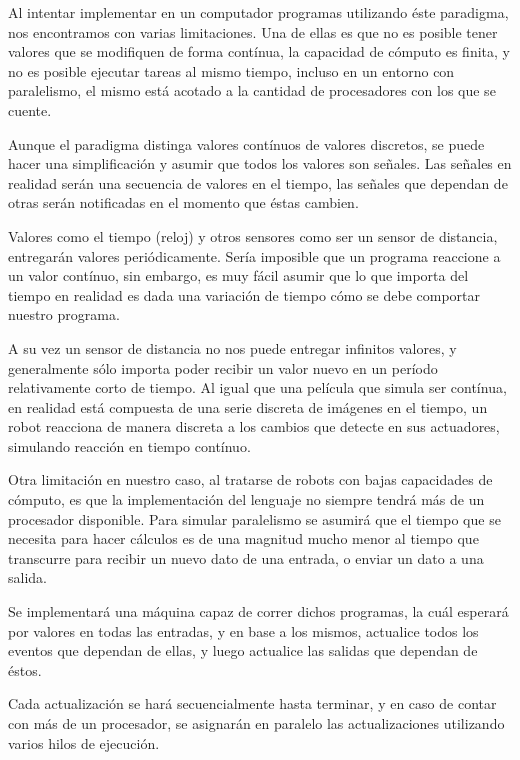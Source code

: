
  Al intentar implementar en un computador programas utilizando éste
paradigma, nos encontramos con varias limitaciones.
  Una de ellas es que no es posible tener valores que se modifiquen de
forma contínua, la capacidad de cómputo es finita, y no es posible
ejecutar tareas al mismo tiempo, incluso en un entorno con
paralelismo, el mismo está acotado a la cantidad de procesadores
con los que se cuente.

  Aunque el paradigma distinga valores contínuos de valores
  discretos, se puede hacer una simplificación y asumir que todos
  los valores son señales.
  Las señales en realidad serán una secuencia de valores en el tiempo,
las señales que dependan de otras serán notificadas en el momento
que éstas cambien.

  Valores como el tiempo (reloj) y otros sensores como ser un sensor de
distancia, entregarán valores periódicamente.
  Sería imposible que un programa reaccione a un valor contínuo,
sin embargo, es muy fácil asumir que lo que importa del tiempo en realidad
es dada una variación de tiempo cómo se debe comportar nuestro programa.

  A su vez un sensor de distancia no nos puede entregar infinitos valores,
y generalmente sólo importa poder recibir un valor nuevo en un período
relativamente corto de tiempo.
  Al igual que una película que simula ser contínua, en realidad está
compuesta de una serie discreta de imágenes en el tiempo, un robot
reacciona de manera discreta a los cambios que detecte en sus actuadores,
simulando reacción en tiempo contínuo.

  Otra limitación en nuestro caso, al tratarse de robots con bajas
capacidades de cómputo, es que la implementación del lenguaje no
siempre tendrá más de un procesador disponible.
  Para simular paralelismo se asumirá que el tiempo que se necesita
para hacer cálculos es de una magnitud mucho menor al tiempo que
transcurre para recibir un nuevo dato de una entrada, o enviar un
dato a una salida.

  Se implementará una máquina capaz de correr dichos programas,
la cuál esperará por valores en todas las entradas, y en base a los
mismos, actualice todos los eventos que dependan de ellas,
y luego actualice las salidas que dependan de éstos.

  Cada actualización se hará secuencialmente hasta terminar, y en
caso de contar con más de un procesador, se asignarán en paralelo
las actualizaciones utilizando varios hilos de ejecución.
